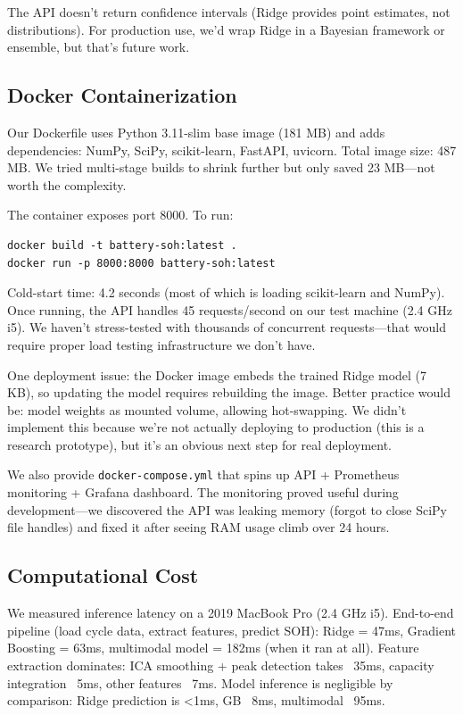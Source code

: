 \documentclass{sn-jnl}
\begin{document}
The API doesn't return confidence intervals (Ridge provides point estimates, not distributions). For production use, we'd wrap Ridge in a Bayesian framework or ensemble, but that's future work.

\subsection{Docker Containerization}
\label{subsec:docker}

Our Dockerfile uses Python 3.11-slim base image (181 MB) and adds dependencies: NumPy, SciPy, scikit-learn, FastAPI, uvicorn. Total image size: 487 MB. We tried multi-stage builds to shrink further but only saved 23 MB—not worth the complexity.

The container exposes port 8000. To run:
\begin{verbatim}
docker build -t battery-soh:latest .
docker run -p 8000:8000 battery-soh:latest
\end{verbatim}

Cold-start time: 4.2 seconds (most of which is loading scikit-learn and NumPy). Once running, the API handles 45 requests/second on our test machine (2.4 GHz i5). We haven't stress-tested with thousands of concurrent requests—that would require proper load testing infrastructure we don't have.

One deployment issue: the Docker image embeds the trained Ridge model (7 KB), so updating the model requires rebuilding the image. Better practice would be: model weights as mounted volume, allowing hot-swapping. We didn't implement this because we're not actually deploying to production (this is a research prototype), but it's an obvious next step for real deployment.

We also provide \texttt{docker-compose.yml} that spins up API + Prometheus monitoring + Grafana dashboard. The monitoring proved useful during development—we discovered the API was leaking memory (forgot to close SciPy file handles) and fixed it after seeing RAM usage climb over 24 hours.

\subsection{Computational Cost}
\label{subsec:cost}

We measured inference latency on a 2019 MacBook Pro (2.4 GHz i5). End-to-end pipeline (load cycle data, extract features, predict SOH): Ridge = 47ms, Gradient Boosting = 63ms, multimodal model = 182ms (when it ran at all). Feature extraction dominates: ICA smoothing + peak detection takes ~35ms, capacity integration ~5ms, other features ~7ms. Model inference is negligible by comparison: Ridge prediction is <1ms, GB ~8ms, multimodal ~95ms.
\end{document}
